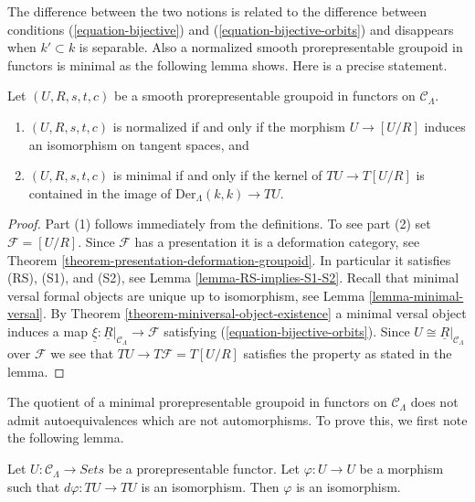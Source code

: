 \noindent
The difference between the two notions is related to the difference between
conditions (\ref{equation-bijective}) and (\ref{equation-bijective-orbits})
and disappears when $k' \subset k$ is separable. Also a
normalized smooth prorepresentable groupoid in functors is minimal
as the following lemma shows. Here is a precise statement.

\begin{lemma}
\label{lemma-characterize-minimal-groupoid-in-functors}
Let $(U, R, s, t, c)$ be a smooth prorepresentable groupoid in
functors on $\mathcal{C}_\Lambda$.
\begin{enumerate}
\item $(U, R, s, t, c)$ is normalized if and only if the morphism
$U \to [U/R]$ induces an isomorphism on tangent spaces, and
\item $(U, R, s, t, c)$ is minimal if and only if the kernel of
$TU \to T[U/R]$ is contained in the image of
$\text{Der}_\Lambda(k, k) \to TU$.
\end{enumerate}
\end{lemma}

\begin{proof}
Part (1) follows immediately from the definitions.
To see part (2) set $\mathcal{F} = [U/R]$. Since $\mathcal{F}$
has a presentation it is a deformation category, see
Theorem \ref{theorem-presentation-deformation-groupoid}.
In particular it satisfies (RS), (S1), and (S2), see
Lemma \ref{lemma-RS-implies-S1-S2}.
Recall that minimal versal formal objects are unique up to isomorphism, see
Lemma \ref{lemma-minimal-versal}.
By
Theorem \ref{theorem-miniversal-object-existence}
a minimal versal object induces a map
$\underline{\xi} : \underline{R}|_{\mathcal{C}_\Lambda} \to \mathcal{F}$
satisfying (\ref{equation-bijective-orbits}). Since
$U \cong \underline{R}|_{\mathcal{C}_\Lambda}$ over $\mathcal{F}$
we see that $TU \to T\mathcal{F} = T[U/R]$ satisfies the property
as stated in the lemma.
\end{proof}

\noindent
The quotient of a minimal prorepresentable groupoid in functors on $\mathcal
C_\Lambda$ does not admit autoequivalences which are not automorphisms.  To
prove this, we first note the following lemma.

\begin{lemma}
\label{lemma-surjective-morphism-prorepresentable-functor}
Let $U: \mathcal{C}_\Lambda \to \textit{Sets}$ be a
prorepresentable functor. Let $\varphi: U \to U$ be a morphism such
that $d\varphi: TU \to TU$ is an isomorphism.  Then $\varphi$ is an
isomorphism.
\end{lemma}

